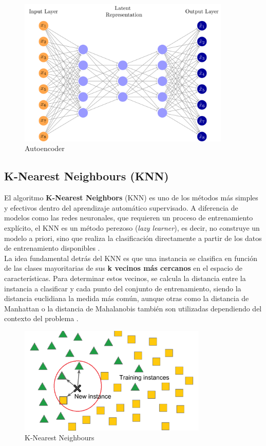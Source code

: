 \documentclass[12pt]{article} %
\begin{document}
\begin{figure}[!ht]
    \centering
    \includegraphics[width=0.9\textwidth]{autoencoder.png}
    \caption{Autoencoder\cite{janosh_autoencoder}}
    \label{fig:autoencoder}
\end{figure}

\subsection{K-Nearest Neighbours (KNN)}
El algoritmo \textbf{K-Nearest Neighbors} (KNN) es uno de los métodos más simples y efectivos dentro del aprendizaje automático supervisado. A diferencia de modelos como las redes neuronales, que requieren un proceso de entrenamiento explícito, el KNN es un método perezoso (\textit{lazy learner}), es decir, no construye un modelo a priori, sino que realiza la clasificación directamente a partir de los datos de entrenamiento disponibles \cite{cover1967nearest}. \\

La idea fundamental detrás del KNN es que una instancia se clasifica en función de las clases mayoritarias de sus \textbf{k vecinos más cercanos} en el espacio de características. Para determinar estos vecinos, se calcula la distancia entre la instancia a clasificar y cada punto del conjunto de entrenamiento, siendo la distancia euclidiana la medida más común, aunque otras como la distancia de Manhattan o la distancia de Mahalanobis también son utilizadas dependiendo del contexto del problema \cite{chomboon2015empirical}. \\

\begin{figure}[!ht]
    \centering
    \includegraphics[width=0.8\textwidth]{knn.png}
    \caption{K-Nearest Neighbours \cite{mlarchive_knn}}
    \label{fig:knn}
\end{figure}
\end{document}
